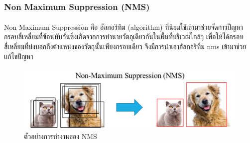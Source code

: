 \subsubsection{Non Maximum Suppression (NMS)}
Non Maximum Suppression\textsuperscript{\cite{nms}} คือ อัลกอริทึม (algorithm) ที่นิยมใช้เข้ามาช่วยจัดการปัญหากรอบสี่เหลี่ยมที่ซ้อนทับกันซึ่งเกิดจากการทำนายวัตถุเดียวกันในพื้นที่บริเวณใกล้ๆ เพื่อให้ได้กรอบสี่เหลี่ยมที่บ่งบอกถึงตำแหน่งของวัตถุนั้นเพียงกรอบเดียว จึงมีการนำเอาอัลกอริทึ่ม nms เข้ามาช่วยแก้ไขปัญหา 
\begin{figure}[!ht]
	\centering
	\includegraphics[scale=0.3]{chapter2/images/NMS.png}
		\caption[ตัวอย่างการทำงานของ NMS]{ตัวอย่างการทำงานของ NMS\textsuperscript{\cite{nms_pic}}}
    	\label{fig:NMS}
\end{figure}


